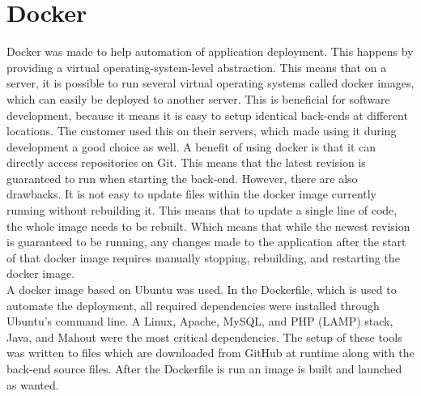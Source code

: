 \section{Docker}
\label{subsec:docker}

Docker \cite{EHW2} was made to help automation of application deployment. This happens by providing a virtual operating-system-level abstraction. This means that on a server, it is possible to run several virtual operating systems called docker images, which can easily be deployed to another server. This is beneficial for software development, because it means it is easy to setup identical back-ends at different locations. The customer used this on their servers, which made using it during development a good choice as well. A benefit of using docker is that it can directly access repositories on Git. This means that the latest revision is guaranteed to run when starting the back-end. However, there are also drawbacks. It is not easy to update files within the docker image currently running without rebuilding it. This means that to update a single line of code, the whole image needs to be rebuilt. Which means that while the newest revision is guaranteed to be running, any changes made to the application after the start of that docker image requires manually stopping, rebuilding, and restarting the docker image. \\

A docker image based on Ubuntu was used. In the Dockerfile, which is used to automate the deployment, all required dependencies were installed through Ubuntu's command line. A Linux, Apache, MySQL, and PHP (LAMP) stack, Java, and Mahout were the most critical dependencies. The setup of these tools was written to files which are downloaded from GitHub at runtime along with the back-end source files. After the Dockerfile is run an image is built and launched as wanted.


\cleardoublepage